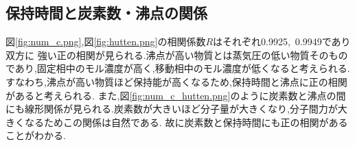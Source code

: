 \subsection{保持時間と炭素数・沸点の関係}
図\ref{fig:num_c.png},図\ref{fig:hutten.png}の相関係数$R$はそれぞれ0.9925,\ 0.9949であり双方に
強い正の相関が見られる.沸点が高い物質とは蒸気圧の低い物質そのものであり,固定相中のモル濃度が高く,移動相中のモル濃度が低くなると考えられる.
すなわち,沸点が高い物質ほど保持能が高くなるため,保持時間と沸点に正の相関があると考えられる.
また,図\ref{fig:num_c_hutten.png}のように炭素数と沸点の間にも線形関係が見られる.炭素数が大きいほど分子量が大きくなり,分子間力が大きくなるためこの関係は自然である.
故に炭素数と保持時間にも正の相関があることがわかる.
